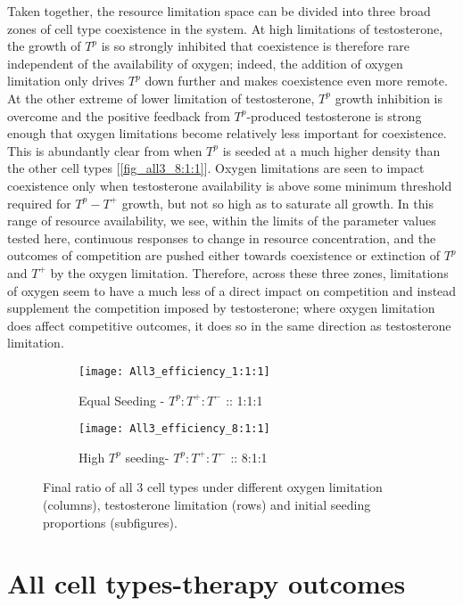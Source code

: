 Taken together, the resource limitation space can be divided into three broad zones of cell type coexistence in the system. At high limitations of testosterone, the growth of $T^p$ is so strongly inhibited that coexistence is therefore rare independent of the availability of oxygen; indeed, the addition of oxygen limitation only drives $T^p$ down further and makes coexistence even more remote. At the other extreme of lower limitation of testosterone, $T^p$ growth inhibition is overcome and the positive feedback from $T^p$-produced testosterone is strong enough that oxygen limitations become relatively less important for coexistence. This is abundantly clear from when $T^p$ is seeded at a much higher density than the other cell types [\autoref{fig_all3_8:1:1}]. Oxygen limitations are seen to impact coexistence only when testosterone availability is above some minimum threshold required for $T^p - T^+$ growth, but not so high as to saturate all growth. In this range of resource availability, we see, within the limits of the parameter values tested here, continuous responses to change in resource concentration, and the outcomes of competition are pushed either towards coexistence or extinction of $T^p$ and $T^+$ by the oxygen limitation. Therefore, across these three zones, limitations of oxygen seem to have a much less of a direct impact on competition and instead supplement the competition imposed by testosterone; where oxygen limitation does affect competitive outcomes, it does so in the same direction as testosterone limitation.

\begin{figure}[h!]
  \centering
  \begin{subfigure}[b]{\textwidth}
    \centering
    \texttt{[image: All3\_efficiency\_1:1:1]}
    \caption{Equal Seeding - $T^p:T^+:T^-$ :: 1:1:1 }
    \label{fig_all3_1:1:1}
  \end{subfigure}
  \begin{subfigure}[b]{\textwidth}
    \centering
    \texttt{[image: All3\_efficiency\_8:1:1]}
    \caption{High $T^p$ seeding- $T^p:T^+:T^-$ :: 8:1:1}
    \label{fig_all3_8:1:1}
  \end{subfigure}
  \caption[Final ratio of all 3 cell types under different limitations]{Final ratio of all 3 cell types under different oxygen limitation (columns), testosterone limitation (rows) and initial seeding proportions (subfigures).}
  \label{fig_all3}
\end{figure}

\chapter{All cell types-therapy outcomes}
